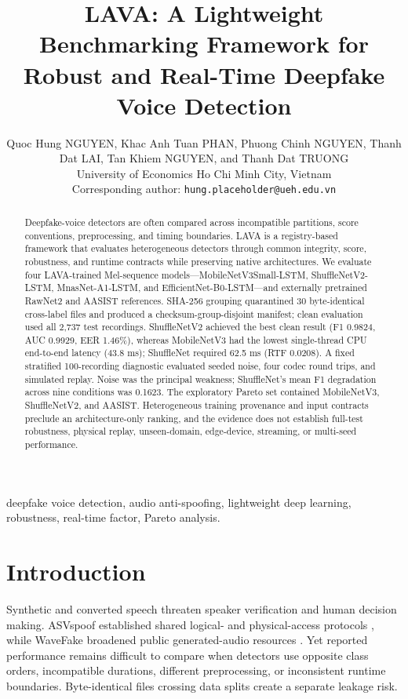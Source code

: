 \documentclass[10pt,journal,onecolumn,a4paper]{IEEEtran}
\title{LAVA: A Lightweight Benchmarking Framework for Robust and Real-Time Deepfake Voice Detection}
\author{Quoc Hung NGUYEN, Khac Anh Tuan PHAN, Phuong Chinh NGUYEN, Thanh Dat LAI, Tan Khiem NGUYEN, and Thanh Dat TRUONG\\[-1mm]
\normalsize University of Economics Ho Chi Minh City, Vietnam\\[-1mm]
\small Corresponding author: \texttt{hung.placeholder@ueh.edu.vn}}
\begin{document}
\maketitle
\begin{abstract}
Deepfake-voice detectors are often compared across incompatible partitions, score conventions, preprocessing, and timing boundaries. LAVA is a registry-based framework that evaluates heterogeneous detectors through common integrity, score, robustness, and runtime contracts while preserving native architectures. We evaluate four LAVA-trained Mel-sequence models---MobileNetV3Small-LSTM, ShuffleNetV2-LSTM, MnasNet-A1-LSTM, and EfficientNet-B0-LSTM---and externally pretrained RawNet2 and AASIST references. SHA-256 grouping quarantined 30 byte-identical cross-label files and produced a checksum-group-disjoint manifest; clean evaluation used all 2,737 test recordings. ShuffleNetV2 achieved the best clean result (F1 0.9824, AUC 0.9929, EER 1.46\%), whereas MobileNetV3 had the lowest single-thread CPU end-to-end latency (43.8 ms); ShuffleNet required 62.5 ms (RTF 0.0208). A fixed stratified 100-recording diagnostic evaluated seeded noise, four codec round trips, and simulated replay. Noise was the principal weakness; ShuffleNet's mean F1 degradation across nine conditions was 0.1623. The exploratory Pareto set contained MobileNetV3, ShuffleNetV2, and AASIST. Heterogeneous training provenance and input contracts preclude an architecture-only ranking, and the evidence does not establish full-test robustness, physical replay, unseen-domain, edge-device, streaming, or multi-seed performance.
\end{abstract}
\begin{IEEEkeywords}deepfake voice detection, audio anti-spoofing, lightweight deep learning, robustness, real-time factor, Pareto analysis.
\end{IEEEkeywords}

\section{Introduction}
Synthetic and converted speech threaten speaker verification and human decision making. ASVspoof established shared logical- and physical-access protocols \cite{wu2015asvspoof,kinnunen2017asvspoof,todisco2019asvspoof,yamagishi2021asvspoof,kinnunen2018tdcf}, while WaveFake broadened public generated-audio resources \cite{frank2021wavefake}. Yet reported performance remains difficult to compare when detectors use opposite class orders, incompatible durations, different preprocessing, or inconsistent runtime boundaries. Byte-identical files crossing data splits create a separate leakage risk.
\end{document}
